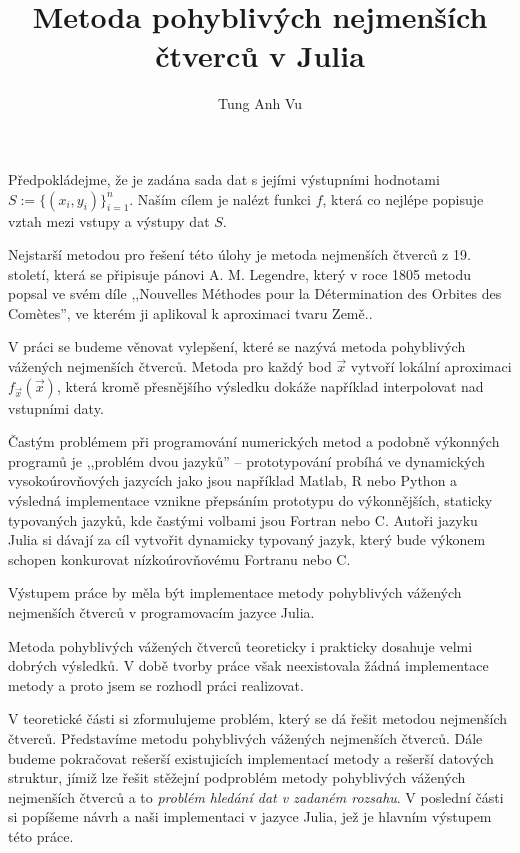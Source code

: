 \documentclass[thesis=B,czech]{FITthesis}[2012/06/26]
\title{Metoda pohyblivých nejmenších čtverců v Julia}
\author{Tung Anh Vu} %
\theoremstyle{newthm}
\begin{document}

\begin{introduction}
Předpokládejme, že je zadána sada dat s jejími výstupními hodnotami $S := \{(x_i, y_i)\}_{i = 1}^n$. Naším cílem je nalézt funkci $f$, která co nejlépe popisuje vztah mezi vstupy a výstupy dat $S$.

Nejstarší metodou pro řešení této úlohy je metoda nejmenších čtverců z 19. století, která se připisuje pánovi A. M. Legendre, který v roce 1805 metodu popsal ve svém díle ,,Nouvelles Méthodes pour la Détermination des Orbites des Com\`etes'', ve kterém ji aplikoval k aproximaci tvaru Země.\cite[s.~12--14]{history_of_statistics}.

V práci se budeme věnovat vylepšení, které se nazývá metoda pohyblivých vážených nejmenších čtverců. Metoda pro každý bod $\vec{x}$ vytvoří lokální aproximaci $f_{\vec{x}}(\vec{x})$, která kromě přesnějšího výsledku dokáže například interpolovat nad vstupními daty.

Častým problémem při programování numerických metod a podobně výkonných programů je ,,problém dvou jazyků'' -- prototypování probíhá ve dynamických vysokoúrovňových jazycích jako jsou například Matlab, R nebo Python a výsledná implementace vznikne přepsáním prototypu do výkonnějších, staticky typovaných jazyků, kde častými volbami jsou Fortran nebo C. Autoři jazyku Julia si dávají za cíl vytvořit dynamicky typovaný jazyk, který bude výkonem schopen konkurovat nízkoúrovňovému Fortranu nebo C.\cite{julia}

Výstupem práce by měla být implementace metody pohyblivých vážených nejmenších čtverců v programovacím jazyce Julia.

Metoda pohyblivých vážených čtverců teoreticky i prakticky dosahuje velmi dobrých výsledků.\cite{surfaces-mwls, mwls-approximation-power} V době tvorby práce však neexistovala žádná implementace metody a proto jsem se rozhodl práci realizovat.

V teoretické části si zformulujeme problém, který se dá řešit metodou nejmenších čtverců. Představíme metodu pohyblivých vážených nejmenších čtverců. Dále budeme pokračovat rešerší existujicích implementací metody a rešerší datových struktur, jímiž lze řešit stěžejní podproblém metody pohyblivých vážených nejmenších čtverců a to \textit{problém hledání dat v zadaném rozsahu}. V poslední části si popíšeme návrh a naši implementaci v jazyce Julia, jež je hlavním výstupem této práce.
\end{introduction}
\end{document}
